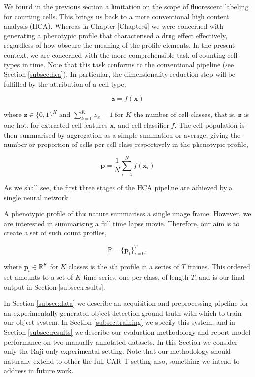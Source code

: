 We found in the previous section a limitation on the scope of fluorescent labeling for counting cells. This brings us back to a more conventional high content analysis (HCA). Whereas in Chapter \ref{Chapter4} we were concerned with generating a phenotypic profile that characterised a drug effect effectively, regardless of how obscure the meaning of the profile elements. In the present context, we are concerned with the more comprehensible task of counting cell types in time. Note that this task conforms to the conventional pipeline (see Section \ref{subsec:hca}). In particular, the dimensionality reduction step will be fulfilled by the attribution of a cell type,

\begin{equation}
\mathbf{z} = f(\mathbf{x})
\end{equation}

where $\mathbf{z} \in \{0, 1\}^K$ and $\sum_{k=0}^K z_k = 1$ for $K$ the number of cell classes, that is, $\mathbf{z}$ is one-hot, for extracted cell features $\mathbf{x}$, and cell classifier $f$. The cell population is then summarised by aggregation as a simple summation or average, giving the number or proportion of cells per cell class respectively in the phenotypic profile,

\begin{equation}
\mathbf{p} = \frac{1}{N}\sum_{i=1}^N f(\mathbf{x}_i)
\end{equation}

As we shall see, the first three stages of the HCA pipeline are achieved by a single neural network.

A phenotypic profile of this nature summarises a single image frame. However, we are interested in summarising a full time lapse movie. Therefore, our aim is to create a set of such count profiles,

\begin{equation}
\mathbb{P} = \{\mathbf{p}_i\}_{i=0}^{T},
\end{equation}

where $\mathbf{p}_i \in \mathbb{R}^K$ for $K$ classes is the $i$th profile in a series of $T$ frames. This ordered set amounts to a set of $K$ time series, one per class, of length $T$, and is our final output in Section \ref{subsec:results}.

In Section \ref{subsec:data} we describe an acquisition and preprocessing pipeline for an experimentally-generated object detection ground truth with which to train our object system. In Section \ref{subsec:training} we specify this system, and in Section \ref{subsec:results} we describe our evaluation methodology and report model performance on two manually annotated datasets. In this Section we consider only the Raji-only experimental setting. Note that our methodology should naturally extend to other the full CAR-T setting also, something we intend to address in future work.

